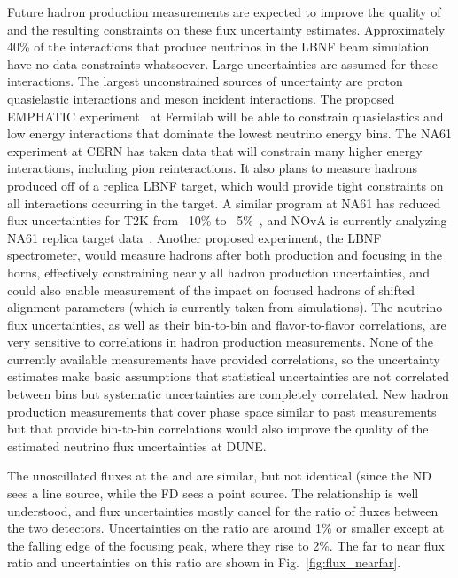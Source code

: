 Future hadron production measurements are expected to improve the quality of and the resulting constraints on these flux uncertainty estimates.  Approximately 40\% of the interactions that produce neutrinos in the LBNF beam simulation have no data constraints whatsoever.  Large uncertainties are assumed for these interactions. The largest unconstrained sources of uncertainty are proton quasielastic interactions and meson incident interactions.  The proposed EMPHATIC experiment~\cite{Akaishi:2019dej} at Fermilab will be able to constrain quasielastics and low energy interactions that dominate the lowest neutrino energy bins.  The NA61 experiment at CERN has taken data that will constrain many higher energy interactions, including pion reinteractions. It  also plans to measure hadrons produced off of a replica LBNF target, which would provide tight constraints on all interactions occurring in the target.  A similar program at NA61 has reduced flux uncertainties for T2K from ~10\% to ~5\%~\cite{Vladisavljevic:2018prd}, and NOvA is currently analyzing NA61 replica target data~\cite{Aduszkiewicz:2222876}.  Another proposed experiment, the LBNF spectrometer, would measure hadrons after both production and focusing in the horns, effectively constraining nearly all hadron production uncertainties, and could also enable measurement of the impact on focused hadrons of shifted alignment parameters (which is currently taken from simulations).  
The neutrino flux uncertainties, as well as their bin-to-bin and  flavor-to-flavor correlations, are very sensitive to correlations in hadron production measurements.  None of the currently available measurements have provided correlations, so the uncertainty estimates make basic assumptions that statistical uncertainties are not correlated between bins but systematic uncertainties are completely correlated.  New hadron production measurements that cover phase space similar to past measurements but that provide bin-to-bin correlations would also improve the quality of the estimated neutrino flux uncertainties at DUNE.     

The unoscillated fluxes at the  and  are similar, but not identical (since the ND sees a line source, while the FD sees a point source. The relationship is well understood, and flux uncertainties mostly cancel for the ratio of fluxes between the two detectors.  Uncertainties on the ratio are around 1\% or smaller except at the falling edge of the focusing peak, where they rise to 2\%. The far to near flux ratio and uncertainties on this ratio are shown in Fig.~\ref{fig:flux_nearfar}. 

